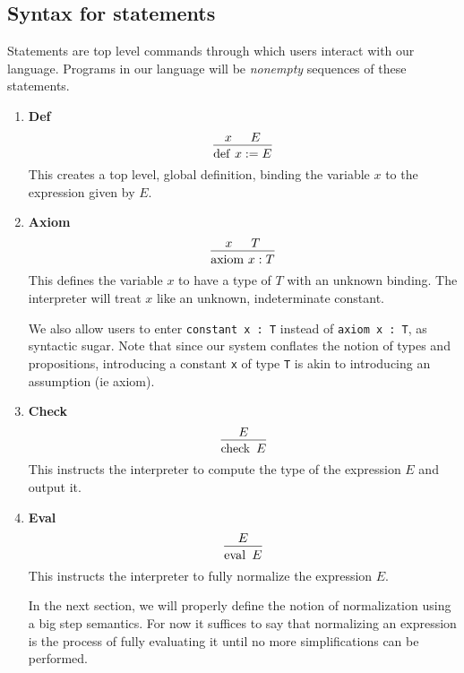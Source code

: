 \documentclass{article}
\begin{document}
\subsection{Syntax for statements}
Statements are top level commands through which users interact with our
language. Programs in our language will be \textit{nonempty} sequences of
these statements.

\begin{enumerate}
\item \textbf{Def} \\
\[
  \begin{prooftree}
    \hypo{x}
    \hypo{E}
    \infer2{\deff \, x := E}
  \end{prooftree}
\]
This creates a top level, global definition, binding the variable $x$ to the
expression given by $E$.

\item \textbf{Axiom} \\
\[
  \begin{prooftree}
    \hypo{x}
    \hypo{T}
    \infer2{\axiom \, x : T}
  \end{prooftree}
\]
This defines the variable $x$ to have a type of $T$ with an unknown binding.
The interpreter will treat $x$ like an unknown, indeterminate constant.

We also allow users to enter \verb|constant x : T| instead of \verb|axiom x : T|,
as syntactic sugar. Note that since our system conflates the notion of types and
propositions, introducing a constant \verb|x| of type \verb|T| is akin to
introducing an assumption (ie axiom).

\item \textbf{Check} \\
\[
  \begin{prooftree}
    \hypo{E}
    \infer1{\checkk \,\, E}
  \end{prooftree}
\]
This instructs the interpreter to compute the type of the expression $E$ and
output it.

\item \textbf{Eval} \\
\[
  \begin{prooftree}
    \hypo{E}
    \infer1{\evall \,\, E}
  \end{prooftree}
\]
This instructs the interpreter to fully normalize the expression $E$.

In the next section, we will properly define the notion of normalization using a
big step semantics. For now it suffices to say that normalizing an expression
is the process of fully evaluating it until no more simplifications can be
performed.

\end{enumerate}
\end{document}
